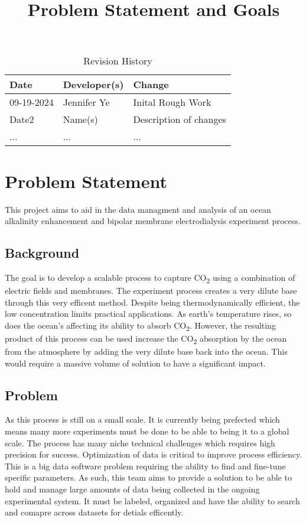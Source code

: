 \documentclass{article}
\title{Problem Statement and Goals\\\progname}
\author{\authname}
\date{}
\begin{document}
\maketitle

\begin{table}[hp]
\caption{Revision History} \label{TblRevisionHistory}
\begin{tabularx}{\textwidth}{llX}
\toprule
\textbf{Date} & \textbf{Developer(s)} & \textbf{Change}\\
\midrule
09-19-2024 & Jennifer Ye & Inital Rough Work \\
Date2 & Name(s) & Description of changes\\
... & ... & ...\\
\bottomrule
\end{tabularx}
\end{table}

\section{Problem Statement}
This project aims to aid in the data managment and analysis of an ocean alkalinity enhancement and bipolar membrane electrodialysis experiment process. 

\subsection{Background}
The goal is to develop a scalable process to capture CO\textsubscript{2} using a combination of electric fields and membranes.
The experiment process creates a very dilute base through this very efficent method. 
Despite being thermodynamically efficient, the low concentration limits practical applications. As earth's temperature rises, so does the ocean's affecting its ability to 
absorb CO\textsubscript{2}. However, the resulting product of this process
can be used increase the CO\textsubscript{2} absorption by the ocean from the atmosphere by adding the very dilute base back into the ocean. 
This would require a massive volume of solution to have a significant impact. 

\subsection{Problem}
As this process is still on a small scale. It is currently being prefected which means many more experiments must be done to be able to being it to a global scale. 
The process has many niche technical challenges which requires high precision for success.
Optimization of data is critical to improve process efficiency. This is a big data software problem requiring the ability to find and fine-tune specific parameters. 
\newline
As such, this team aims to provide a solution to be able to hold and manage large amounts of data being collected in the ongoing experimental system.
It must be labeled, organized and have the ability to search and comapre across datasets for detials efficently.
\newline
\end{document}
